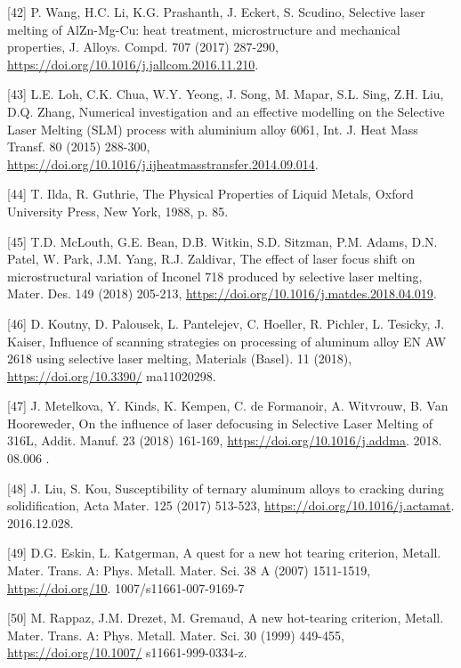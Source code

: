 \documentclass[10pt]{article}
\begin{document}
[42] P. Wang, H.C. Li, K.G. Prashanth, J. Eckert, S. Scudino, Selective laser melting of AlZn-Mg-Cu: heat treatment, microstructure and mechanical properties, J. Alloys. Compd. 707 (2017) 287-290, \href{https://doi.org/10.1016/j.jallcom.2016.11.210}{https://doi.org/10.1016/j.jallcom.2016.11.210}.

[43] L.E. Loh, C.K. Chua, W.Y. Yeong, J. Song, M. Mapar, S.L. Sing, Z.H. Liu, D.Q. Zhang, Numerical investigation and an effective modelling on the Selective Laser Melting (SLM) process with aluminium alloy 6061, Int. J. Heat Mass Transf. 80 (2015) 288-300, \href{https://doi.org/10.1016/j.ijheatmasstransfer.2014.09.014}{https://doi.org/10.1016/j.ijheatmasstransfer.2014.09.014}.

[44] T. Ilda, R. Guthrie, The Physical Properties of Liquid Metals, Oxford University Press, New York, 1988, p. 85.

[45] T.D. McLouth, G.E. Bean, D.B. Witkin, S.D. Sitzman, P.M. Adams, D.N. Patel, W. Park, J.M. Yang, R.J. Zaldivar, The effect of laser focus shift on microstructural variation of Inconel 718 produced by selective laser melting, Mater. Des. 149 (2018) 205-213, \href{https://doi.org/10.1016/j.matdes.2018.04.019}{https://doi.org/10.1016/j.matdes.2018.04.019}.

[46] D. Koutny, D. Palousek, L. Pantelejev, C. Hoeller, R. Pichler, L. Tesicky, J. Kaiser, Influence of scanning strategies on processing of aluminum alloy EN AW 2618 using selective laser melting, Materials (Basel). 11 (2018), \href{https://doi.org/10.3390/}{https://doi.org/10.3390/} ma11020298.

[47] J. Metelkova, Y. Kinds, K. Kempen, C. de Formanoir, A. Witvrouw, B. Van Hooreweder, On the influence of laser defocusing in Selective Laser Melting of 316L, Addit. Manuf. 23 (2018) 161-169, \href{https://doi.org/10.1016/j.addma}{https://doi.org/10.1016/j.addma}. 2018. 08.006 .

[48] J. Liu, S. Kou, Susceptibility of ternary aluminum alloys to cracking during solidification, Acta Mater. 125 (2017) 513-523, \href{https://doi.org/10.1016/j.actamat}{https://doi.org/10.1016/j.actamat}. 2016.12.028.

[49] D.G. Eskin, L. Katgerman, A quest for a new hot tearing criterion, Metall. Mater. Trans. A: Phys. Metall. Mater. Sci. 38 A (2007) 1511-1519, \href{https://doi.org/10}{https://doi.org/10}. 1007/s11661-007-9169-7

[50] M. Rappaz, J.M. Drezet, M. Gremaud, A new hot-tearing criterion, Metall. Mater. Trans. A: Phys. Metall. Mater. Sci. 30 (1999) 449-455, \href{https://doi.org/10.1007/}{https://doi.org/10.1007/} s11661-999-0334-z.
\end{document}
